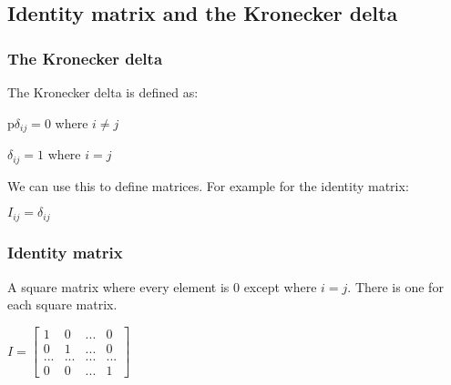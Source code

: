 
\subsection{Identity matrix and the Kronecker delta}
\subsubsection{The Kronecker delta}

The Kronecker delta is defined as:

p\(\delta_{ij}=0\) where \(i\ne j\)

\(\delta_{ij}=1\) where \(i=j\)

We can use this to define matrices. For example for the identity matrix:

\(I_{ij}=\delta_{ij}\)

\subsubsection{Identity matrix}

A square matrix where every element is \(0\) except where \(i=j\). There is one for each square matrix.

$I=\begin{bmatrix}1& 0&...&0\\0 & 1&...&0\\...&...&...&...\\0&0&...&1\end{bmatrix}$

